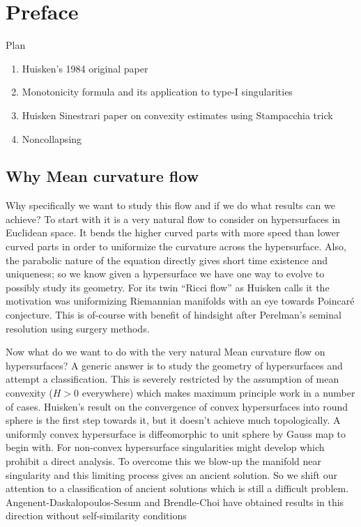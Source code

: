 \chapter{Preface}Plan 

\begin{enumerate}
    \item Huisken's 1984 original paper
    \item Monotonicity formula and its application to type-I singularities
    \item Huisken Sinestrari paper on convexity estimates using Stampacchia trick
    \item Noncollapsing
\end{enumerate}


    \section*{Why Mean curvature flow}

Why specifically we want to study this flow and if we do what results can we achieve? To start with it is a very natural flow to consider on hypersurfaces in Euclidean space. It bends the higher curved parts with more speed than lower curved parts in order to uniformize the curvature across the hypersurface. Also, the parabolic nature of the equation directly gives short time existence and uniqueness; so we know given a hypersurface we have one way to evolve to possibly study its geometry. For its twin ``Ricci flow'' as Huisken calls it the motivation was uniformizing Riemannian manifolds with an eye towards Poincar\'e conjecture. This is of-course with benefit of hindsight after Perelman's seminal resolution using surgery methods. 

Now what do we want to do with the very natural Mean curvature flow on hypersurfaces? A generic answer is to study the geometry of hypersurfaces and attempt a classification. This is severely restricted by the assumption of mean convexity ($ H>0 $ everywhere) which makes maximum principle work in a number of cases. Huisken's result on the convergence of convex hypersurfaces into round sphere is the first step towards it, but it doesn't achieve much topologically. A uniformly convex hypersurface is diffeomorphic to unit sphere by Gauss map to begin with. For non-convex hypersurface singularities might develop which prohibit a direct analysis. To overcome this we blow-up the manifold near singularity and this limiting process gives an ancient solution. So we shift our attention to a classification of ancient solutions which is still a difficult problem. Angenent-Daskalopoulos-Sesum and Brendle-Choi have obtained results in this direction without self-similarity conditions

